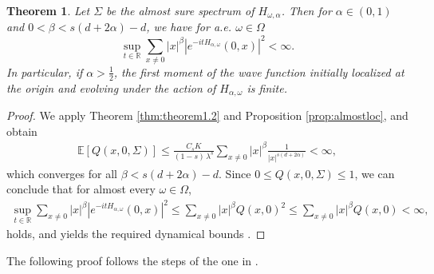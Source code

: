 \documentclass[11pt, a4paper, UKenglish, oneside]{book}
\theoremstyle{plain}
\newtheorem{theorem}{Theorem}
\theoremstyle{remark}
\theoremstyle{definition}
\numberwithin{equation}{section}
\numberwithin{theorem}{section}
\begin{document}
\begin{theorem}\label{thm:almostdynloc}
    Let $\Sigma$ be the almost sure spectrum of $H_{\omega,\alpha}$. Then for $\alpha \in (0,1)$ and $0 < \beta < s(d+2\alpha)-d$, we have for a.e. $\omega \in \Omega$
            \begin{equation}
            \sup_{t \in \mathbb{R}} \sum_{x \ne 0} |x|^{\beta} |e^{-itH_{\alpha,\omega}}(0,x)|^2 < \infty.
            \end{equation}
            In particular, if $\alpha > \frac{1}{2}$, the first moment of the wave function initially localized at the origin and evolving under the action of $H_{\alpha,\omega}$ is finite.
\end{theorem}
\begin{proof}
    We apply Theorem \ref{thm:theorem1.2} and Proposition \ref{prop:almostloc}, and obtain
    \begin{align*}
        \mathbb{E}[Q(x,0,\Sigma)] \le \frac{C_s K}{(1-s)\,\lambda^s} \sum_{x \ne 0} |x|^\beta \frac{1}{|x|^{s(d+2\alpha)}} < \infty,
    \end{align*}
    which converges for all $\beta < s(d+2\alpha)-d$. Since $0 \le Q(x,0,\Sigma) \le 1$, we can conclude that for almost every $\omega \in \Omega$, 
    \begin{align*}
        \sup_{t \in \mathbb{R}} \sum_{x \ne 0} |x|^\beta |e^{-itH_{\alpha,\omega}}(0,x)|^2 \le \sum_{x \ne 0} |x|^\beta Q(x,0)^2 \le \sum_{x \ne 0} |x|^\beta Q(x,0) < \infty,
    \end{align*}
    holds, and yields the required dynamical bounds .
\end{proof}
The following proof follows the steps of the one in \cite{aizenman2015}.
\end{document}
